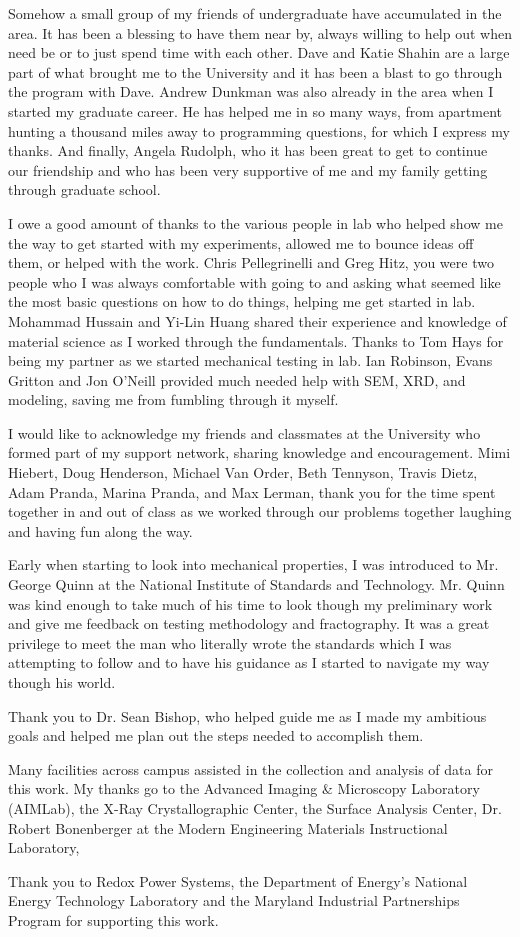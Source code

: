 Somehow a small group of my friends of undergraduate have accumulated in the area.
It has been a blessing to have them near by, always willing to help out when need be or to just spend time with each other.
Dave and Katie Shahin are a large part of what brought me to the University and it has been a blast to go through the program with Dave.
Andrew Dunkman was also already in the area when I started my graduate career.
He has helped me in so many ways, from apartment hunting a thousand miles away to programming questions, for which I express my thanks.
And finally, Angela Rudolph, who it has been great to get to continue our friendship and who has been very supportive of me and my family getting through graduate school.

I owe a good amount of thanks to the various people in lab who helped show me the way to get started with my experiments, allowed me to bounce ideas off them, or helped with the work.
Chris Pellegrinelli and Greg Hitz, you were two people who I was always comfortable with going to and asking what seemed like the most basic questions on how to do things, helping me get started in lab.
Mohammad Hussain and Yi-Lin Huang shared their experience and knowledge of material science as I worked through the fundamentals.
Thanks to Tom Hays for being my partner as we started mechanical testing in lab.
Ian Robinson, Evans Gritton and Jon O'Neill provided much needed help with SEM, XRD, and modeling, saving me from fumbling through it myself.

I would like to acknowledge my friends and classmates at the University who formed part of my support network, sharing knowledge and encouragement.
Mimi Hiebert, Doug Henderson, Michael Van Order, Beth Tennyson, Travis Dietz, Adam Pranda, Marina Pranda, and Max Lerman, thank you for the time spent together in and out of class as we worked through our problems together laughing and having fun along the way.

Early when starting to look into mechanical properties, I was introduced to Mr. George Quinn at the National Institute of Standards and Technology.
Mr. Quinn was kind enough to take much of his time to look though my preliminary work and give me feedback on testing methodology and fractography.
It was a great privilege to meet the man who literally wrote the standards which I was attempting to follow and to have his guidance as I started to navigate my way though his world.

Thank you to Dr. Sean Bishop, who helped guide me as I made my ambitious goals and helped me plan out the steps needed to accomplish them.

Many facilities across campus assisted in the collection and analysis of data for this work. My thanks go to the Advanced Imaging \& Microscopy Laboratory (AIMLab), the X-Ray Crystallographic Center, the Surface Analysis Center, Dr. Robert Bonenberger at the Modern Engineering Materials Instructional Laboratory,

Thank you to Redox Power Systems, the Department of Energy's National Energy Technology Laboratory and the Maryland Industrial Partnerships Program for supporting this work.
